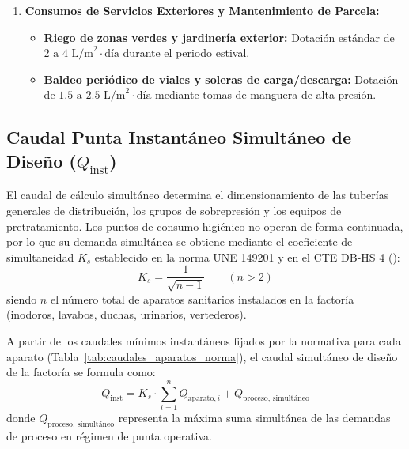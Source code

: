 \documentclass{report}
\begin{document}
\begin{enumerate}
    \item \textbf{Consumos de Servicios Exteriores y Mantenimiento de Parcela:}
          \begin{itemize}
              \item \textbf{Riego de zonas verdes y jardinería exterior:} Dotación estándar de $2\text{ a }4\text{ L/m}^2\cdot\text{día}$ durante el periodo estival.
              \item \textbf{Baldeo periódico de viales y soleras de carga/descarga:} Dotación de $1.5\text{ a }2.5\text{ L/m}^2\cdot\text{día}$ mediante tomas de manguera de alta presión.
          \end{itemize}
\end{enumerate}

\subsection{Caudal Punta Instantáneo Simultáneo de Diseño ($Q_{\text{inst}}$)}

El caudal de cálculo simultáneo determina el dimensionamiento de las tuberías generales de distribución, los grupos de sobrepresión y los equipos de pretratamiento. Los puntos de consumo higiénico no operan de forma continuada, por lo que su demanda simultánea se obtiene mediante el coeficiente de simultaneidad $K_s$ establecido en la norma UNE 149201 y en el CTE DB-HS 4 (\cite{CTE_DB_HS4, UNE_149201_2017}):
\begin{equation}
    K_s = \frac{1}{\sqrt{n - 1}} \qquad (n > 2)
    \label{eq:coef_simultaneidad}
\end{equation}
siendo $n$ el número total de aparatos sanitarios instalados en la factoría (inodoros, lavabos, duchas, urinarios, vertederos).

A partir de los caudales mínimos instantáneos fijados por la normativa para cada aparato (Tabla~\ref{tab:caudales_aparatos_norma}), el caudal simultáneo de diseño de la factoría se formula como:
\begin{equation}
    Q_{\text{inst}} = K_s \cdot \sum_{i=1}^{n} Q_{\text{aparato}, i} + Q_{\text{proceso, simultáneo}}
    \label{eq:caudal_punta_simultaneo}
\end{equation}
donde $Q_{\text{proceso, simultáneo}}$ representa la máxima suma simultánea de las demandas de proceso en régimen de punta operativa.
\end{document}
